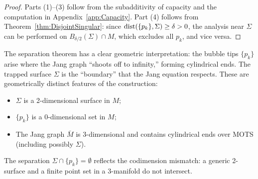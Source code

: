 \begin{proof}
Parts (1)--(3) follow from the subadditivity of capacity and the computation in Appendix~\ref{app:Capacity}. Part (4) follows from Theorem~\ref{thm:DisjointSingular}: since $\mathrm{dist}(\{p_k\}, \Sigma) \ge \delta > 0$, the analysis near $\Sigma$ can be performed on $B_{\delta/2}(\Sigma) \cap M$, which excludes all $p_k$, and vice versa.
\end{proof}

\begin{remark}
The separation theorem has a clear geometric interpretation: the bubble tips $\{p_k\}$ arise where the Jang graph ``shoots off to infinity,'' forming cylindrical ends. The trapped surface $\Sigma$ is the ``boundary'' that the Jang equation respects. These are geometrically distinct features of the construction:
\begin{itemize}
    \item $\Sigma$ is a 2-dimensional surface in $M$;
    \item $\{p_k\}$ is a 0-dimensional set in $M$;
    \item The Jang graph $\bar{M}$ is 3-dimensional and contains cylindrical ends over MOTS (including possibly $\Sigma$).
\end{itemize}
The separation $\Sigma \cap \{p_k\} = \emptyset$ reflects the codimension mismatch: a generic 2-surface and a finite point set in a 3-manifold do not intersect.
\end{remark}
